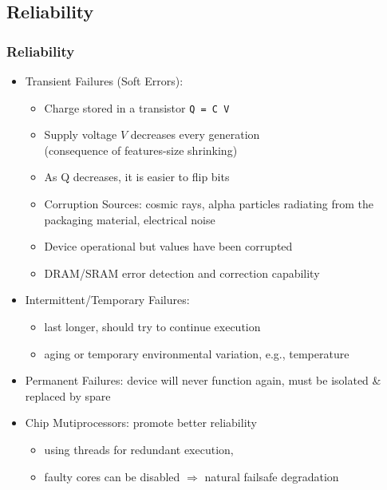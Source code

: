 \documentclass{beamer}
\renewcommand{\emph}[1]{\textcolor{structure}{#1}}
\newcommand{\emp}[1]{\textcolor{DikuRed}{ #1}}
\begin{document}
\subsection{Reliability}

\begin{frame}[fragile,t]
\frametitle{Reliability}

\begin{itemize}
    \item \emp{Transient Failures (Soft Errors):}
        \begin{itemize}
            \item Charge stored in a transistor \emp{\tt Q = C V}
            \item Supply voltage $V$ decreases every generation\\
                    (consequence of features-size shrinking)
            \item As Q decreases, it is easier to flip bits
            \item Corruption Sources: cosmic rays, alpha particles
                    radiating from the packaging material, electrical noise
            \item Device operational but values have been corrupted
            \item DRAM/SRAM error detection and correction capability
        \end  {itemize}\medskip

    \item \emp{Intermittent/Temporary Failures:}
            \begin{itemize}
                \item last longer, should try to continue execution
                \item aging or temporary environmental variation, e.g., temperature
            \end  {itemize}\medskip

    \item \emp{Permanent Failures:} device will never function again,
                must be isolated \& replaced by spare\medskip

    \item \emph{Chip Mutiprocessors: promote better reliability}
            \begin{itemize}
                \item using threads for redundant execution, 
                \item faulty cores can be disabled $\Rightarrow$ 
                        natural failsafe degradation
            \end  {itemize}
\end  {itemize}
\end{frame}
\end{document}
